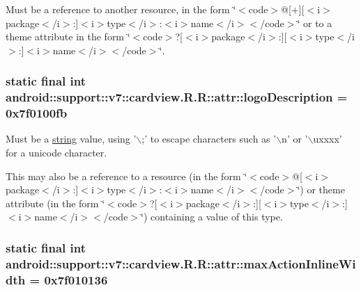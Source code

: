 Must be a reference to another resource, in the form \char`\"{}$<$code$>$@\mbox{[}+\mbox{]}\mbox{[}$<$i$>$package$<$/i$>$:\mbox{]}$<$i$>$type$<$/i$>$:$<$i$>$name$<$/i$>$$<$/code$>$\char`\"{} or to a theme attribute in the form \char`\"{}$<$code$>$?\mbox{[}$<$i$>$package$<$/i$>$:\mbox{]}\mbox{[}$<$i$>$type$<$/i$>$:\mbox{]}$<$i$>$name$<$/i$>$$<$/code$>$\char`\"{}. \hypertarget{classandroid_1_1support_1_1v7_1_1cardview_1_1_r_1_1attr_024a5ac545ae24299cda4a30cd2bd0e1}{
\subsubsection[{logoDescription}]{\setlength{\rightskip}{0pt plus 5cm}static final int android::support::v7::cardview.R.R::attr::logoDescription = 0x7f0100fb}}
\label{classandroid_1_1support_1_1v7_1_1cardview_1_1_r_1_1attr_024a5ac545ae24299cda4a30cd2bd0e1}


Must be a \hyperlink{classandroid_1_1support_1_1v7_1_1cardview_1_1_r_1_1string}{string} value, using '$\backslash$;' to escape characters such as '$\backslash$n' or '$\backslash$uxxxx' for a unicode character. 

This may also be a reference to a resource (in the form \char`\"{}$<$code$>$@\mbox{[}$<$i$>$package$<$/i$>$:\mbox{]}$<$i$>$type$<$/i$>$:$<$i$>$name$<$/i$>$$<$/code$>$\char`\"{}) or theme attribute (in the form \char`\"{}$<$code$>$?\mbox{[}$<$i$>$package$<$/i$>$:\mbox{]}\mbox{[}$<$i$>$type$<$/i$>$:\mbox{]}$<$i$>$name$<$/i$>$$<$/code$>$\char`\"{}) containing a value of this type. \hypertarget{classandroid_1_1support_1_1v7_1_1cardview_1_1_r_1_1attr_db6ef43310575c62b4c883cc7cd81e7f}{
\subsubsection[{maxActionInlineWidth}]{\setlength{\rightskip}{0pt plus 5cm}static final int android::support::v7::cardview.R.R::attr::maxActionInlineWidth = 0x7f010136}}
\label{classandroid_1_1support_1_1v7_1_1cardview_1_1_r_1_1attr_db6ef43310575c62b4c883cc7cd81e7f}


